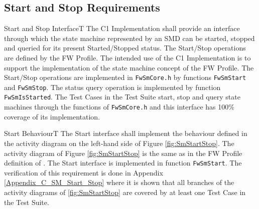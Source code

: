\documentclass[a4paper,10pt]{article}
\newenvironment{fw_req}[6]
{\addtocounter{subsubsection}{1}
	\hspace{0.2cm}\textbf{FW-\arabic{section}.\arabic{subsection}.\arabic{subsubsection}/#2
	\hspace{0.8cm} #1}
	\vspace{-10pt}
\begin{longtable}{p{2.7cm}P{8.5cm}}
\hline
\textsc{Requirement} & #3 \\
\textsc{Justification} & #4 \\
\textsc{Implementation} & #5  \\ 
\textsc{Verification} & #6  \\
\hline
}
{\end{longtable}}
\begin{document}
\subsection{Start and Stop Requirements}\label{req:startStopInterface}

\begin{fw_req}{Start and Stop Interface}{T}
{ The C1 Implementation shall provide an interface through 
which the state machine represented by an SMD can be started, 
stopped and queried for its present Started/Stopped status.}
{The Start/Stop operations are defined by the FW Profile. 
The intended use of the C1 Implementation is to support 
the implementation of the state machine concept of the FW Profile.}
{The Start/Stop operations are implemented in \texttt{FwSmCore.h}
 by functions \texttt{FwSmStart} and \texttt{FwSmStop}. 
The status query operation is implemented by function \texttt{FwSmIsStarted}.} 
{The Test Cases in the Test Suite start, stop and query state machines 
through the functions of \texttt{FwSmCore.h} and this interface has 100\% coverage of its implementation.}
\end{fw_req}


\begin{fw_req}{Start Behaviour}{T}
{The Start interface shall implement the behaviour defined in the activity diagram on the left-hand side of 
Figure \ref{fig:SmStartStop}.}
{The activity diagram of Figure \ref{fig:SmStartStop} is the same as in the FW Profile definition of \cite{ref:fwprofile}.}
{The Start interface is implemented in function \texttt{FwSmStart}.} 
{The verification of this requirement is done in Appendix
\ref{Appendix_C_SM_Start_Stop} where it is shown that all branches of the activity diagrams of
\ref{fig:SmStartStop} are covered by at least one Test Case in the Test Suite.}
\end{fw_req}
\end{document}
